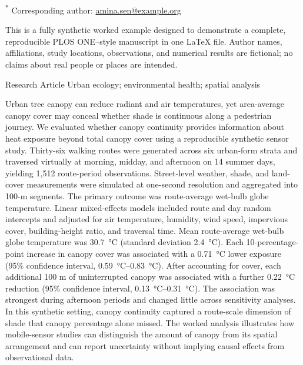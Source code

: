 \documentclass[10pt,letterpaper]{article}
\begin{document}
\begin{titlepage}
\vspace{18pt}
{\small
\textsuperscript{*} Corresponding author: \href{mailto:amina.sen@example.org}{amina.sen@example.org}\par
}

\vfill
\begin{keybox}
This is a fully synthetic worked example designed to demonstrate a complete, reproducible PLOS ONE--style manuscript in one \LaTeX{} file. Author names, affiliations, study locations, observations, and numerical results are fictional; no claims about real people or places are intended.
\end{keybox}

\vspace{13pt}
{\small\color{Slate}
 Research Article\quad
{} Urban ecology; environmental health; spatial analysis\par
}
\end{titlepage}

\hypersetup{pageanchor=true}
\begin{abstractpanel}
Urban tree canopy can reduce radiant and air temperatures, yet area-average canopy cover may conceal whether shade is continuous along a pedestrian journey. We evaluated whether canopy continuity provides information about heat exposure beyond total canopy cover using a reproducible synthetic sensor study. Thirty-six walking routes were generated across six urban-form strata and traversed virtually at morning, midday, and afternoon on 14 summer days, yielding 1,512 route-period observations. Street-level weather, shade, and land-cover measurements were simulated at one-second resolution and aggregated into 100-m segments. The primary outcome was route-average wet-bulb globe temperature. Linear mixed-effects models included route and day random intercepts and adjusted for air temperature, humidity, wind speed, impervious cover, building-height ratio, and traversal time. Mean route-average wet-bulb globe temperature was \SI{30.7}{\degreeCelsius} (standard deviation \SI{2.4}{\degreeCelsius}). Each 10-percentage-point increase in canopy cover was associated with a \SI{0.71}{\degreeCelsius} lower exposure (95\% confidence interval, \SIrange{0.59}{0.83}{\degreeCelsius}). After accounting for cover, each additional 100 m of uninterrupted canopy was associated with a further \SI{0.22}{\degreeCelsius} reduction (95\% confidence interval, \SIrange{0.13}{0.31}{\degreeCelsius}). The association was strongest during afternoon periods and changed little across sensitivity analyses. In this synthetic setting, canopy continuity captured a route-scale dimension of shade that canopy percentage alone missed. The worked analysis illustrates how mobile-sensor studies can distinguish the amount of canopy from its spatial arrangement and can report uncertainty without implying causal effects from observational data.
\end{abstractpanel}
\end{document}

